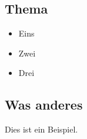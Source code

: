 \documentclass{handout}
\begin{document}
\maketitle

\begin{2col}
  \subsection{Thema}
  \begin{itemize}
      \item Eins
      \item Zwei
      \item Drei
  \end{itemize}

  \subsection{Was anderes}
  Dies ist ein Beispiel.
\end{2col}

\newpage
\nocite{*}
\printbibliography{}
\end{document}
